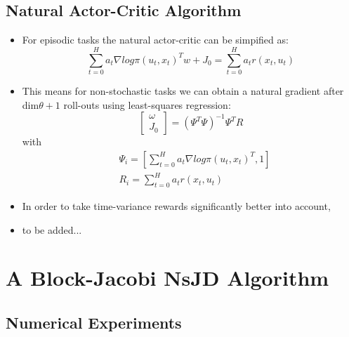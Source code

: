{\begin{pcolumn}
\subsection{Natural Actor-Critic Algorithm}
\vspace*{-16mm}
%
{\large
\begin{itemize}
	\item For episodic tasks the natural actor-critic can be simpified as:
\begin{equation}
	\sum_{t=0}^H a_t \nabla log \pi(u_t, x_t)^Tw + J_0 = \sum_{t=0}^H a_t r(x_t, u_t)
\end{equation}
	\item This means for non-stochastic tasks we can obtain a natural gradient after dim$\theta + 1$ roll-outs using least-squares regression:
\begin{equation}
	\left[
	\begin{matrix}
		\omega \\
		J_0
	\end{matrix}
	\right] = (\Psi^T \Psi)^{-1}\Psi^T R
\end{equation}
with
\begin{eqnarray}
	& \Psi_i = \left[\sum_{t=0}^{H}a_t \nabla log \pi (u_t, x_t)^T, 1 \right] \\
	& R_i = \sum_{t=0}^{H}a_t r(x_t, u_t)
\end{eqnarray}

	\item In order to take time-variance rewards significantly better into account, \vspace{-2mm}

	\item to be added...
\end{itemize}

\vspace*{-2mm}
}


\section{A Block-Jacobi NsJD Algorithm}
%
\vspace*{-18mm}

\subsection{Numerical Experiments}
%


\end{pcolumn}}
